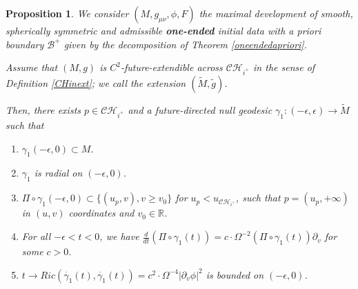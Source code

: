 \documentclass[10pt,a4paper]{article}
\theoremstyle{plain}
\newtheorem{prop}[thm]{Proposition}
\theoremstyle{remark}
\theoremstyle{definition}
\newcommand{\RR}{\mathbb{R}}
\theoremstyle{plain}
\theoremstyle{remark}
\theoremstyle{definition}
\newcommand{\CH}{\mathcal{CH}_{i^+}}
\numberwithin{equation}{section}
\begin{document}
\begin{prop} \label{geomextendoneened}
	We consider $(M,g_{\mu \nu}, \phi,F)$ the maximal development of smooth, spherically symmetric and admissible \textbf{one-ended} initial data with a priori boundary $\mathcal{B^+}$ given by the decomposition of Theorem \ref{oneendedapriori}.
	
	Assume that $(M,g)$ is $C^2$-future-extendible across $\CH$ in the sense of Definition \ref{CHinext}; we call the extension $(\tilde{M},\tilde{g})$.
	
	Then, there exists $p \in \CH$ and a future-directed null geodesic $\gamma_1:(-\epsilon,\epsilon) \rightarrow \tilde{M}$ such that  \begin{enumerate}
		\item $\gamma_1(-\epsilon,0) \subset M$.
		\item $\gamma_{1}$ is radial on $(-\epsilon,0)$.
		\item  $\Pi \circ \gamma_{1}(-\epsilon,0) \subset \{ (u_p,v), v \geq v_0\}$ for $u_p<u_{\CH}$, such that $p=(u_p,+\infty)$ in $(u,v)$ coordinates and $v_0 \in \RR$.
		\item For all $-\epsilon < t <0$, we have $\frac{d}{dt}(\Pi \circ \gamma_1(t))=c  \cdot \Omega^{-2}(\Pi \circ \gamma_1(t)) \partial_v$ for some $c>0$.
		\item  \label{Riccibounded2} $t \rightarrow Ric(\dot{\gamma_1}(t),\dot{\gamma_1}(t))= c^2 \cdot \Omega^{-4} |\partial_v \phi|^2$ is bounded on $(-\epsilon,0)$.
	\end{enumerate} 
\end{prop}
\end{document}

